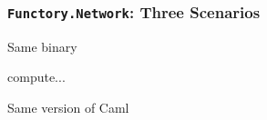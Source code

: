 \documentclass[xcolor=dvipsnames,8pt]{beamer}
\let\emph\alert
\begin{document}

\begin{frame}\frametitle {\texttt{Functory.Network}: Three Scenarios}
  
\emph{Same binary}


\medskip\noindent
{\colorbox{tmpcolor}{\begin{minipage}{\textwidth}\tt\parindent 0pt

\noindent{}\hspace*{1.22ex}compute\hspace*{1.22ex}\hspace*{1.22ex}...
\end{minipage}}}


\medskip\noindent



\bigskip
\emph{Same version of Caml}
    

\medskip\noindent
{\colorbox{tmpcolor}{\begin{minipage}{\textwidth}\tt\parindent 0pt


\end{minipage}}}
\end{frame}
\end{document}
